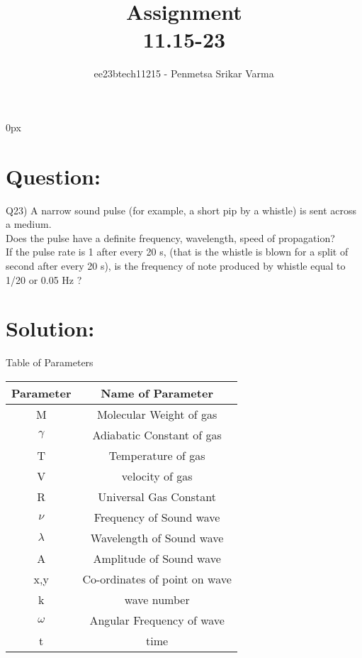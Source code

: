 \documentclass[beamer]{IEEEtran}
\theoremstyle{remark}
\begin{document}
\parindent 0px


\title{Assignment\\[1ex]11.15-23}
\author{ee23btech11215 - Penmetsa Srikar Varma$^{}$%
}
\maketitle
\newpage
\bigskip

\renewcommand{\thefigure}{\theenumi}
\renewcommand{\thetable}{\theenumi}
\section*{Question:}
Q23) A narrow sound pulse (for example, a short pip by a whistle) is sent across a
medium.\\  Does the pulse have a definite  frequency,  wavelength,  speed
of propagation?\\  If the pulse rate is 1 after every 20 s, (that is the whistle is
blown for a split of second after every 20 s), is the frequency of note produced
by whistle equal to 1/20 or 0.05 Hz ?
\section*{Solution:}
{\centering
Table of Parameters\\
}
\begin{table}[h]
    \centering
    \begin{tabular}{|c|c|}
        \hline
         Parameter & Name of Parameter  \\
        \hline
         M & Molecular Weight of gas\\
         \hline
         $\gamma$ & Adiabatic Constant of gas\\
         \hline
         T & Temperature of gas \\
         \hline
         V & velocity of gas \\
         \hline
         R & Universal Gas Constant \\
         \hline
         $\nu$ & Frequency of Sound wave \\
         \hline
         $\lambda$ & Wavelength of Sound wave\\
         \hline
         A & Amplitude of Sound wave\\
         \hline
         x,y & Co-ordinates of point on wave\\
         \hline
         k & wave number\\
         \hline
         $\omega$ & Angular Frequency of wave\\
         \hline
         t & time\\
         \hline
    \end{tabular}
    \label{tab:t1}
\end{table}
\end{document}
